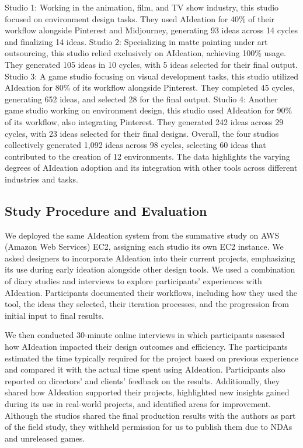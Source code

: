 \begin{table*}[t]
{ Studio 1:  Working in the animation, film, and TV show industry, this studio focused on environment design tasks. They used AIdeation for 40\% of their workflow alongside Pinterest and Midjourney, generating 93 ideas across 14 cycles and finalizing 14 ideas.  Studio 2:  Specializing in matte painting under art outsourcing, this studio relied exclusively on AIdeation, achieving 100\% usage. They generated 105 ideas in 10 cycles, with 5 ideas selected for their final output.  Studio 3:  A game studio focusing on visual development tasks, this studio utilized AIdeation for 80\% of its workflow alongside Pinterest. They completed 45 cycles, generating 652 ideas, and selected 28 for the final output.  Studio 4:  Another game studio working on environment design, this studio used AIdeation for 90\% of its workflow, also integrating Pinterest. They generated 242 ideas across 29 cycles, with 23 ideas selected for their final designs. Overall, the four studios collectively generated 1,092 ideas across 98 cycles, selecting 60 ideas that contributed to the creation of 12 environments. The data highlights the varying degrees of AIdeation adoption and its integration with other tools across different industries and tasks.}
\label{tab:studio_production}
\end{table*}

\subsection{Study Procedure and Evaluation}
We deployed the same AIdeation system from the summative study on AWS (Amazon Web Services) EC2, assigning each studio its own EC2 instance. 
We asked designers to incorporate AIdeation into their current projects, emphasizing its use during early ideation alongside other design tools.
We used a combination of diary studies and interviews to explore participants’ experiences with AIdeation. Participants documented their workflows, including how they used the tool, the ideas they selected, their iteration processes, and the progression from initial input to final results.

We then conducted 30-minute online interviews in which participants assessed how AIdeation impacted their design outcomes and efficiency. The participants estimated the time typically required for the project based on previous experience and compared it with the actual time spent using AIdeation. Participants also reported on directors' and clients' feedback on the results. Additionally, they shared how AIdeation supported their projects, highlighted new insights gained during its use in real-world projects, and identified areas for improvement. 
Although the studios shared the final production results with the authors as part of the field study, they withheld permission for us to publish them due to NDAs and unreleased games.

